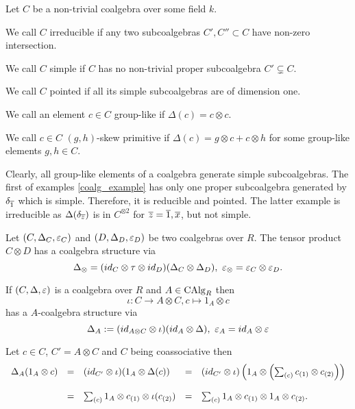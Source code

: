\begin{defi}\label{coalg_type}
Let $C$ be a non-trivial coalgebra over some field $k$.
\bn
\item\label{coalg_irred} We call $C$ irreducible if any two subcoalgebras $C', C'' \subset C$ have non-zero intersection.
\item\label{coalg_simp} We call $C$ simple if $C$ has no non-trivial proper subcoalgebra $C' \subsetneq C$.
\item\label{coalg_point} We call $C$ pointed if all its simple subcoalgebras are of dimension one.
\item \label{coalg_group}We call an element $c \in C$ group-like if $\Delta(c) = c \otimes c$.
\item\label{coalg_skew}We call $c \in C$ $(g,h)$-skew primitive if $\Delta(c) = g \otimes c + c \otimes h$ for some group-like elements $g, h \in C$.
\en
{}
\end{defi}
\bmk Clearly, all group-like elements of a coalgebra generate simple subcoalgebras. The first of examples \ref{coalg_example} has only one proper subcoalgebra generated by $\delta_{\ov{1}}$ which is simple. Therefore, it is reducible and pointed. The latter example is irreducible as $\Delta(\delta_{\ov{z}})$ is in $C^{\otimes 2}$ for $\ov{z} = \ov{1}, \ov{x}$, but not simple.
\begin{defi}
Let $(C, \Delta_C, \eps_C)$ and $(D, \Delta_D, \eps_D)$ be two coalgebras over $R$. The tensor product $C \otimes D$ has a coalgebra structure via
$$\Delta_\otimes = (id_C \otimes \tau \otimes id_D) (\Delta_C \otimes \Delta_D),\ \eps_\otimes = \eps_C \otimes \eps_D.$$
\end{defi}
\begin{lemm}
If $(C, \Delta, \eps)$ is a coalgebra over $R$ and $A \in \trm{CAlg}_R$ then
$$\iota : C \longrightarrow A \otimes C, c \longmapsto 1_A \otimes c$$
has a $A$-coalgebra structure via
$$\Delta_A := (id_{A \otimes C} \otimes \iota) (id_A \otimes \Delta),\ \eps_A = id_A \otimes \eps$$
\end{lemm}
\bws Let $c \in C$, $C' = A \otimes C$ and $C$ being coassociative then
$$\bao{rclcl}
\Delta_A(1_A \otimes c) &=& (id_{C'} \otimes \iota)(1_A \otimes \Delta(c)) &=& (id_{C'} \otimes \iota)\left(1_A \otimes \left(\sum_{(c)} c_{(1)} \otimes c_{(2)}\right)\right)\\
&&&&\\
&=& \sum_{(c)} 1_A \otimes c_{(1)} \otimes \iota(c_{(2)}) &=& \sum_{(c)} 1_A \otimes c_{(1)} \otimes 1_A \otimes c_{(2)}.\\
\ea$$
